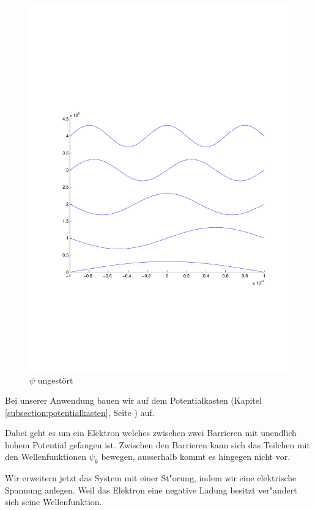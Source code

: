 \begin{refsection}
\begin{figure}
 \centering
 \includegraphics[width=12cm,clip=true,trim=2cm 7cm 1cm 8cm]{efeld/Psi_ungestoert.pdf}
 \caption{$\psi$ ungest\"ort}
 \label{abb:efeld_psi_ungestoert}
\end{figure}

Bei unserer Anwendung bauen wir auf dem Potentialkasten (Kapitel \ref{subsection:potentialkasten}, Seite \pageref{subsection:potentialkasten}) auf.

Dabei geht es um ein Elektron welches zwischen zwei Barrieren mit unendlich hohem Potential gefangen ist.
Zwischen den Barrieren kann sich das Teilchen mit den Wellenfunktionen $\psi_k$ bewegen,
ausserhalb kommt es hingegen nicht vor.

Wir erweitern jetzt das System mit einer St"orung, indem wir eine elektrische Spannung anlegen.
Weil das Elektron eine negative Ladung besitzt ver"andert sich seine Wellenfunktion.


\end{refsection}
